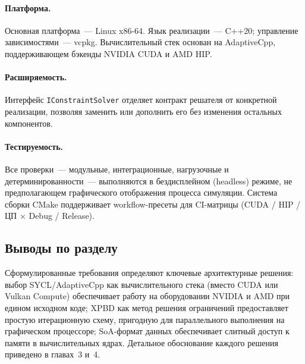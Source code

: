 \paragraph{Платформа.}
Основная платформа~--- Linux x86-64.
Язык реализации~--- C++20; управление зависимостями~--- vcpkg.
Вычислительный стек основан на AdaptiveCpp, поддерживающем бэкенды NVIDIA CUDA и AMD HIP.

\paragraph{Расширяемость.}
Интерфейс \texttt{IConstraintSolver} отделяет контракт решателя от конкретной реализации,
позволяя заменить или дополнить его без изменения остальных компонентов.

\paragraph{Тестируемость.} Все проверки~--- модульные, интеграционные, нагрузочные и детерминированности~--- 
выполняются в бездисплейном (headless) режиме, не предполагающем графического отображения процесса симуляции. 
Система сборки CMake поддерживает workflow-пресеты для CI-матрицы (CUDA / HIP / ЦП $\times$ Debug / Release).

\subsection{Выводы по разделу}

Сформулированные требования определяют ключевые архитектурные решения: выбор SYCL/AdaptiveCpp как вычислительного стека
(вместо CUDA или Vulkan Compute) обеспечивает работу на оборудовании NVIDIA и AMD при едином исходном коде;
XPBD как метод решения ограничений предоставляет простую итерационную схему, пригодную для параллельного
выполнения на графическом процессоре; SoA-формат данных обеспечивает слитный доступ к памяти в вычислительных ядрах. 
Детальное обоснование каждого решения приведено в главах~3 и~4.
